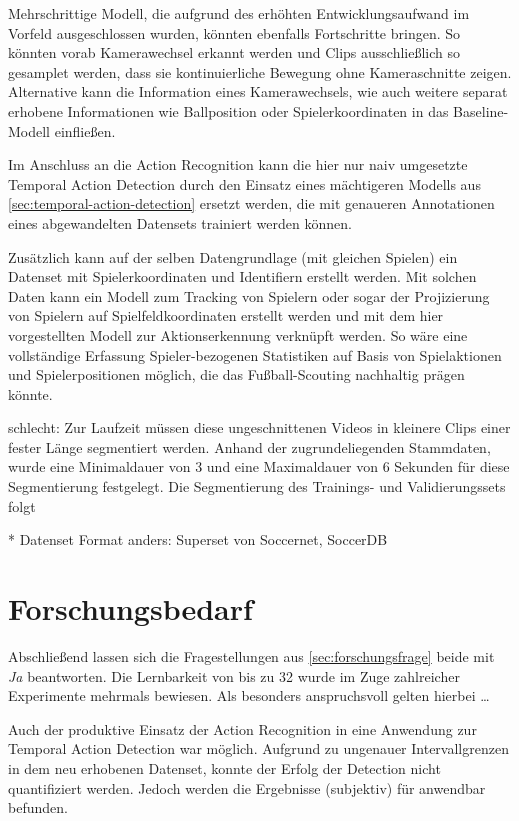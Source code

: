 Mehrschrittige Modell, die aufgrund des erhöhten Entwicklungsaufwand im Vorfeld ausgeschlossen wurden, könnten ebenfalls Fortschritte bringen.
So könnten \zB vorab Kamerawechsel erkannt werden und Clips ausschließlich so gesamplet werden, dass sie kontinuierliche Bewegung ohne Kameraschnitte zeigen.
Alternative kann die Information eines Kamerawechsels, wie auch weitere separat erhobene Informationen wie Ballposition oder Spielerkoordinaten in das Baseline-Modell einfließen.

Im Anschluss an die Action Recognition kann die hier nur naiv umgesetzte Temporal Action Detection durch den Einsatz eines mächtigeren Modells aus \autoref{sec:temporal-action-detection} ersetzt werden, die mit genaueren Annotationen eines abgewandelten Datensets trainiert werden können.

Zusätzlich kann auf der selben Datengrundlage (mit gleichen Spielen) ein Datenset mit Spielerkoordinaten und Identifiern erstellt werden.
Mit solchen Daten kann \ggf ein Modell zum Tracking von Spielern oder sogar der Projizierung von Spielern auf Spielfeldkoordinaten erstellt werden und mit dem hier vorgestellten Modell zur Aktionserkennung verknüpft werden.
So wäre eine vollständige Erfassung Spieler-bezogenen Statistiken auf Basis von Spielaktionen und Spielerpositionen möglich, die das Fußball-Scouting nachhaltig prägen könnte.

schlecht:
Zur Laufzeit müssen diese ungeschnittenen Videos in kleinere Clips einer fester Länge segmentiert werden.
Anhand der zugrundeliegenden Stammdaten, wurde eine Minimaldauer von 3 und eine Maximaldauer von 6 Sekunden für diese Segmentierung festgelegt.
Die Segmentierung des Trainings- und Validierungssets folgt

* Datenset Format anders: Superset von Soccernet, SoccerDB

\section{Forschungsbedarf}
\label{sec:fazit}

Abschließend lassen sich die Fragestellungen aus \autoref{sec:forschungsfrage} beide mit \emph{Ja} beantworten.
Die Lernbarkeit von bis zu 32 wurde im Zuge zahlreicher Experimente mehrmals bewiesen.
Als besonders anspruchsvoll gelten hierbei \dots


Auch der produktive Einsatz der Action Recognition in eine Anwendung zur Temporal Action Detection war möglich.
Aufgrund zu ungenauer Intervallgrenzen in dem neu erhobenen Datenset, konnte der Erfolg der Detection nicht quantifiziert werden.
Jedoch werden die Ergebnisse (subjektiv) für anwendbar befunden.
